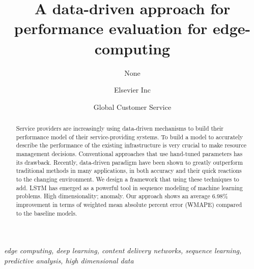 \documentclass[review]{elsarticle}
\begin{document}
\begin{frontmatter}

\title{A data-driven approach for performance evaluation for edge-computing
    }

\author{None
    }
\address{Radarweg 29, Amsterdam}

\author[mymainaddress,mysecondaryaddress]{Elsevier Inc}

\author[mysecondaryaddress]{Global Customer Service}

\address[mymainaddress]{1600 John F Kennedy Boulevard, Philadelphia}
\address[mysecondaryaddress]{360 Park Avenue South, New York}

\begin{abstract}
Service providers are increasingly using data-driven mechanisms to build their performance model of their service-providing systems. To build a model to accurately describe the performance of the existing infrastructure is very crucial to make resource management decisions. Conventional approaches that use hand-tuned parameters has its drawback. Recently, data-driven paradigm have been shown to greatly outperform traditional methods in many applications, in both accuracy and their quick reactions to the changing environment. We design a framework that using these techniques to add. LSTM has emerged as a powerful tool in sequence modeling of machine learning problems. High dimensionality; anomaly. Our approach shows an average 6.98\% improvement in terms of weighted mean absolute percent error (WMAPE) compared to the baseline models.
\end{abstract}
\begin{keyword}
\textit{edge computing, deep learning, content delivery networks, sequence learning, predictive analysis, high dimensional data}
\end{keyword}
\end{frontmatter}
\linenumbers
\end{document}
